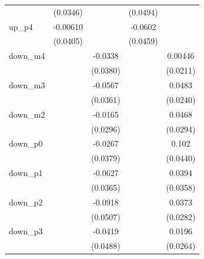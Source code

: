 \begin{table}[htbp]
\begin{tabular}{l*{4}{c}}
                    &    (0.0346)         &                     &    (0.0494)         &                     \\
[1em]
up\_p4               &    -0.00610         &                     &     -0.0602         &                     \\
                    &    (0.0405)         &                     &    (0.0459)         &                     \\
[1em]
down\_m4             &                     &     -0.0338         &                     &     0.00446         \\
                    &                     &    (0.0380)         &                     &    (0.0211)         \\
[1em]
down\_m3             &                     &     -0.0567         &                     &      0.0483\sym{**} \\
                    &                     &    (0.0361)         &                     &    (0.0240)         \\
[1em]
down\_m2             &                     &     -0.0165         &                     &      0.0468         \\
                    &                     &    (0.0296)         &                     &    (0.0294)         \\
[1em]
down\_p0             &                     &     -0.0267         &                     &       0.102\sym{**} \\
                    &                     &    (0.0379)         &                     &    (0.0440)         \\
[1em]
down\_p1             &                     &     -0.0627\sym{*}  &                     &      0.0394         \\
                    &                     &    (0.0365)         &                     &    (0.0358)         \\
[1em]
down\_p2             &                     &     -0.0918\sym{*}  &                     &      0.0373         \\
                    &                     &    (0.0507)         &                     &    (0.0282)         \\
[1em]
down\_p3             &                     &     -0.0419         &                     &      0.0196         \\
                    &                     &    (0.0488)         &                     &    (0.0264)         \\

\end{tabular}
\end{table}
